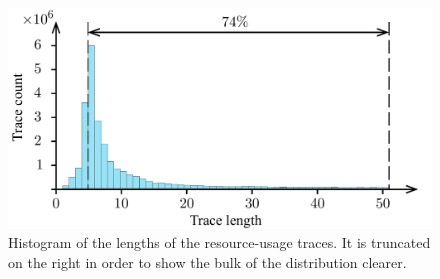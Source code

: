 \begin{figure}[t]
  \centering
  \includegraphics[width=1.0\columnwidth]{include/assets/figures/traces.pdf}
  \vspace{-1.5em}
  \caption{
    Histogram of the lengths of the resource-usage traces. It is truncated on
    the right in order to show the bulk of the distribution clearer.
  }
  \vspace{-1.5em}
\end{figure}
